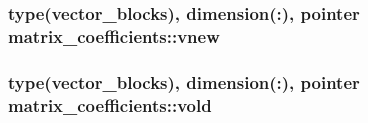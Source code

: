\subsubsection[{\texorpdfstring{vnew}{vnew}}]{\setlength{\rightskip}{0pt plus 5cm}type({\bf vector\+\_\+blocks}), dimension(\+:), pointer matrix\+\_\+coefficients\+::vnew}\hypertarget{namespacematrix__coefficients_acd6ee2b27ca034993909f2165ded3bf8}{}\label{namespacematrix__coefficients_acd6ee2b27ca034993909f2165ded3bf8}
\subsubsection[{\texorpdfstring{vold}{vold}}]{\setlength{\rightskip}{0pt plus 5cm}type({\bf vector\+\_\+blocks}), dimension(\+:), pointer matrix\+\_\+coefficients\+::vold}\hypertarget{namespacematrix__coefficients_aa26a51af7d3b74002acec25325ea0fde}{}\label{namespacematrix__coefficients_aa26a51af7d3b74002acec25325ea0fde}
